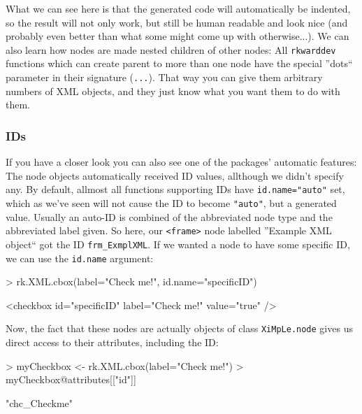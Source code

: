 \documentclass[a4paper,10pt]{scrartcl}
\begin{document}
What we can see here is that the generated code will automatically be indented, so the result will not only work, but still be human readable
and look nice (and probably even better than what some might come up with otherwise...). We can also learn how nodes are made nested children
of other nodes: All \texttt{rkwarddev} functions which can create parent to more than one node have the special ''dots`` parameter in their
signature (\texttt{...}). That way you can give them arbitrary numbers of XML objects, and they just know what you want them to do with them.

\subsubsection{IDs}
If you have a closer look you can also see one of the packages' automatic features: The node objects automatically received
ID values, allthough we didn't specify any. By default, allmost all functions supporting IDs have \texttt{id.name="auto"} set,
which as we've seen will not cause the ID to become \texttt{"auto"}, but a generated value. Usually an auto-ID is combined
of the abbreviated node type and the abbreviated label given. So here, our \texttt{<frame>} node labelled ''Example XML object`` got the
ID \texttt{frm\_ExmplXML}. If we wanted a node to have some specific ID, we can use the \texttt{id.name} argument:

	\begin{Schunk}
		\begin{Sinput}
> rk.XML.cbox(label="Check me!", id.name="specificID")
		\end{Sinput}
		\begin{Soutput}
<checkbox id="specificID" label="Check me!" value="true" />
		\end{Soutput}
	\end{Schunk}

Now, the fact that these nodes are actually objects of class \texttt{XiMpLe.node} gives us direct access to their attributes, including the ID:

	\begin{Schunk}
		\begin{Sinput}
> myCheckbox <- rk.XML.cbox(label="Check me!")
> myCheckbox@attributes[["id"]]
		\end{Sinput}
		\begin{Soutput}
[1] "chc_Checkme"
		\end{Soutput}
	\end{Schunk}
\end{document}
